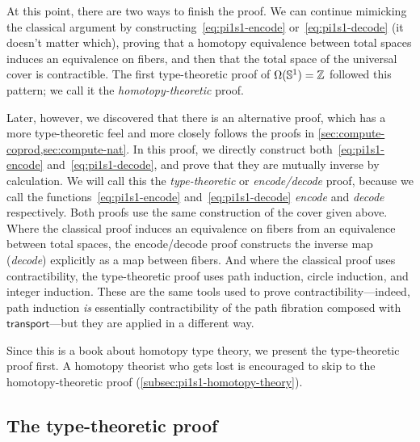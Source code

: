 At this point, there are two ways to finish the proof.
We can continue mimicking the classical argument by constructing~\eqref{eq:pi1s1-encode} or~\eqref{eq:pi1s1-decode} (it doesn't matter which), proving that a homotopy equivalence between total spaces induces an equivalence on fibers, and then that the total space of the universal cover is contractible.
The first type-theoretic proof of $\Omega(\mathbb{S}^1)=\mathbb{Z}$ followed this pattern; we call it the \emph{homotopy-theoretic} proof.

Later, however, we discovered that there is an alternative proof, which has a more type-theoretic feel and more closely follows the proofs in \autoref{sec:compute-coprod,sec:compute-nat}.
In this proof, we directly construct both~\eqref{eq:pi1s1-encode} and~\eqref{eq:pi1s1-decode}, and prove that they are mutually inverse by calculation.
We will call this the \emph{type-theoretic} or \emph{encode/decode} proof, because we call the functions~\eqref{eq:pi1s1-encode} and~\eqref{eq:pi1s1-decode} \emph{encode} and \emph{decode} respectively.
Both proofs use the same construction of the cover given above.
Where the classical proof induces an equivalence on fibers from an equivalence between total spaces, the encode/decode proof constructs the inverse map (\emph{decode}) explicitly as a map between fibers.
And where the classical proof uses contractibility, the type-theoretic proof uses path induction, circle induction, and integer induction.
These are the same tools used to prove contractibility---indeed, path induction \emph{is} essentially contractibility of the path fibration composed with $\mathsf{transport}$---but they are applied in a different way.

Since this is a book about homotopy type theory, we present the type-theoretic proof first.
A homotopy theorist who gets lost is encouraged to skip to the homotopy-theoretic proof (\autoref{subsec:pi1s1-homotopy-theory}).

\subsection{The type-theoretic proof}
\label{subsec:pi1s1-encode-decode}

